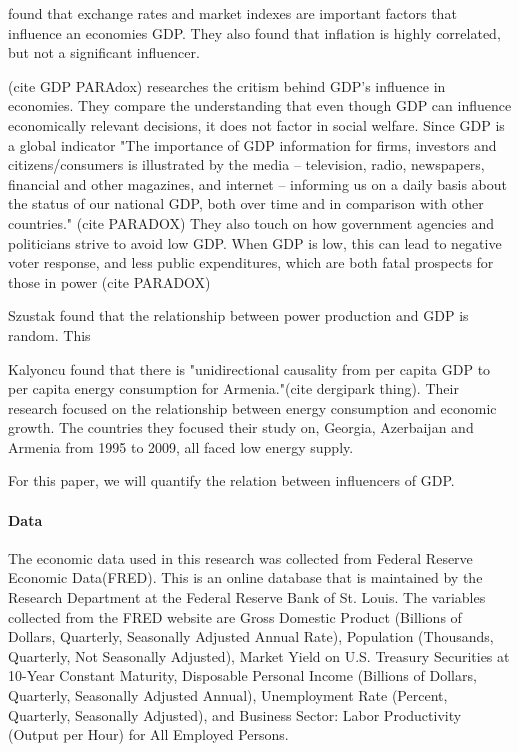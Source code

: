 \documentclass[12pt]{article}
\begin{document}
\citet{divya2014study} found that exchange rates and market indexes are important factors that influence an economies GDP. They also found that inflation is highly correlated, but not a significant influencer.  

(cite GDP PARAdox) researches the critism behind GDP's influence in economies. They compare the understanding that even though GDP can influence economically relevant decisions, it does not factor in social welfare. 
Since GDP is a global indicator "The importance of GDP information for firms, investors and citizens/consumers is illustrated by the media – television, radio, newspapers, financial and other magazines, and internet – informing us on a daily basis about the status of our national GDP, both over time and in comparison with other countries." (cite PARADOX)
They also touch on how government agencies and politicians strive to avoid low GDP. When GDP is low, this can lead to negative voter response, and less public expenditures, which are both fatal prospects for those in power (cite PARADOX) 



Szustak found that the relationship between power production and GDP is random. This 



Kalyoncu found that there is "unidirectional causality from per capita GDP to per capita energy consumption for Armenia."(cite dergipark thing). Their research focused on the relationship between energy consumption and economic growth.
The countries they focused their study on, Georgia, Azerbaijan and Armenia from 1995 to 2009, all faced low energy supply. 

For this paper, we will quantify the relation between influencers of GDP. 






\paragraph{Data}

The economic data used in this research was collected from Federal Reserve Economic Data(FRED). This is an online database that is maintained by the Research Department at the Federal Reserve Bank of St. Louis. 
The variables collected from the FRED website are Gross Domestic Product (Billions of Dollars, Quarterly, Seasonally Adjusted Annual Rate), Population (Thousands, Quarterly, Not Seasonally Adjusted), Market Yield on U.S. Treasury Securities at 10-Year Constant Maturity, Disposable Personal Income (Billions of Dollars, Quarterly, Seasonally Adjusted Annual), Unemployment Rate (Percent, Quarterly, Seasonally Adjusted), and Business Sector: Labor Productivity (Output per Hour) for All Employed Persons. 
\end{document}
